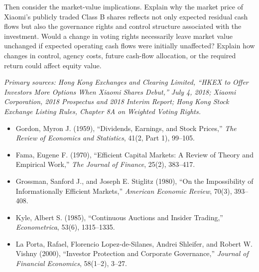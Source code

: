 Then consider the market-value implications. Explain why the market price of Xiaomi's publicly traded Class B shares reflects not only expected residual cash flows but also the governance rights and control structure associated with the investment. Would a change in voting rights necessarily leave market value unchanged if expected operating cash flows were initially unaffected? Explain how changes in control, agency costs, future cash-flow allocation, or the required return could affect equity value.

\emph{Primary sources: Hong Kong Exchanges and Clearing Limited, ``HKEX to Offer Investors More Options When Xiaomi Shares Debut,'' July 4, 2018; Xiaomi Corporation, 2018 Prospectus and 2018 Interim Report; Hong Kong Stock Exchange Listing Rules, Chapter 8A on Weighted Voting Rights.}



\begin{itemize}

\item Gordon, Myron J. (1959),
``Dividends, Earnings, and Stock Prices,''
\emph{The Review of Economics and Statistics}, 41(2, Part 1), 99--105.

\item Fama, Eugene F. (1970),
``Efficient Capital Markets: A Review of Theory and Empirical Work,''
\emph{The Journal of Finance}, 25(2), 383--417.

\item Grossman, Sanford J., and Joseph E. Stiglitz (1980),
``On the Impossibility of Informationally Efficient Markets,''
\emph{American Economic Review}, 70(3), 393--408.

\item Kyle, Albert S. (1985),
``Continuous Auctions and Insider Trading,''
\emph{Econometrica}, 53(6), 1315--1335.

\item La Porta, Rafael, Florencio Lopez-de-Silanes, Andrei Shleifer, and Robert W. Vishny (2000),
``Investor Protection and Corporate Governance,''
\emph{Journal of Financial Economics}, 58(1--2), 3--27.

\end{itemize}

